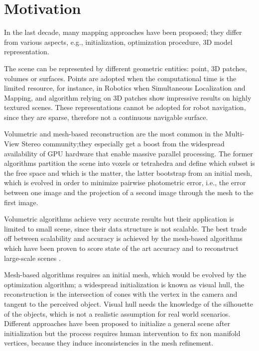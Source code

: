 \section{Motivation}
In the last decade, many mapping approaches have been proposed; they differ from various aspects, e.g., initialization, optimization procedure, 3D model representation.

The scene can be represented by different geometric entities: point, 3D patches, volumes or surfaces.
Points are adopted when the computational time is the limited resource, for instance, in Robotics when Simultaneous Localization and Mapping, and algorithm relying on 3D patches show impressive results on highly textured scenes. 
These representations cannot be adopted for robot navigation, since they are sparse, therefore not a continuous navigable surface.

Volumetric and mesh-based reconstruction are the most common in the Multi-View Stereo community;they especially get a boost from the widespread availability of GPU hardware that enable massive parallel processing.
The former algorithms partition the scene into voxels or tetrahedra and define which subset is the free space and which is the matter, the latter bootstrap from an initial mesh, which is evolved in order to minimize pairwise photometric error, i.e., the error between one image and the projection of a second image through the mesh to the first image.

Volumetric algorithms achieve very accurate results but their application is limited to small scene, since their data structure is not scalable. 
The best trade off between scalability and accuracy is achieved by the mesh-based algorithms which have been proven to score state of the art accuracy \cite{li2015detail} and to reconstruct large-scale scenes \cite{vu_et_al_2012}.


Mesh-based algorithms requires an initial mesh, which would be evolved by the optimization algorithm; a widespread initialization is known as visual hull, the reconstruction is the intersection of cones with the vertex in the camera and tangent to the perceived object.
Visual hull needs the knowledge of the silhouette of the objects, which is not a realistic assumption for real world scenarios.
Different approaches have been proposed to initialize a general scene after initialization but the process requires human intervention to fix non manifold vertices, because they induce inconsistencies in the mesh refinement.

